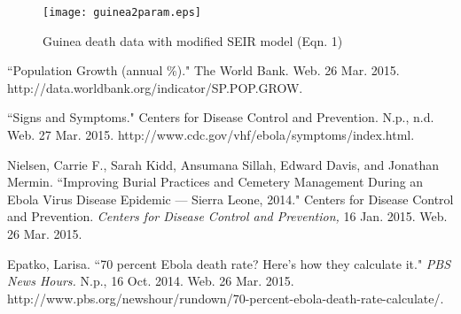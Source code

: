 \documentclass{article}
\begin{document}
       \begin{figure}[H]
           	\centering
       		\texttt{[image: guinea2param.eps]}
            \caption{Guinea death data with modified SEIR model (Eqn. 1)}
       \end{figure}
       


\begin{thebibliography}{3}

 ``Population Growth (annual \%)." The World Bank. Web. 26 Mar. 2015. http://data.worldbank.org/indicator/SP.POP.GROW. 

 ``Signs and Symptoms." Centers for Disease Control and Prevention. N.p., n.d. Web. 27 Mar. 2015. http://www.cdc.gov/vhf/ebola/symptoms/index.html. 

Nielsen, Carrie F., Sarah Kidd, Ansumana Sillah, Edward Davis, and Jonathan Mermin. ``Improving Burial Practices and Cemetery Management During an Ebola Virus Disease Epidemic — Sierra Leone, 2014." Centers for Disease Control and Prevention. \emph{Centers for Disease Control and Prevention,} 16 Jan. 2015. Web. 26 Mar. 2015.

 Epatko, Larisa. ``70 percent Ebola death rate? Here’s how they calculate it." \emph{PBS News Hours.} N.p., 16 Oct. 2014. Web. 26 Mar. 2015. http://www.pbs.org/newshour/rundown/70-percent-ebola-death-rate-calculate/. 



\end{thebibliography}	
                                                                         
\end{document}
